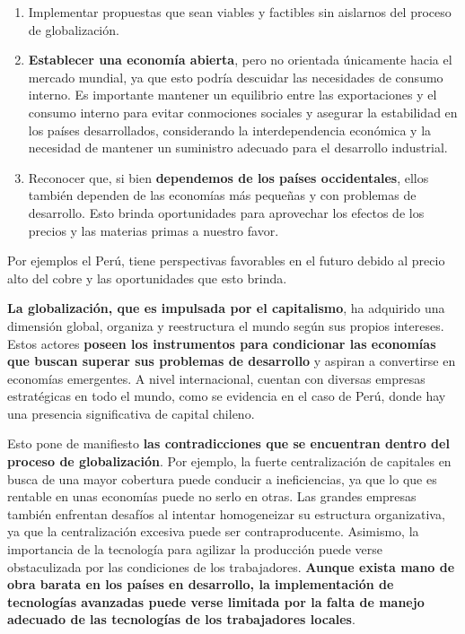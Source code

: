 \documentclass[
  letterpaper,
  DIV=11,
  numbers=noendperiod]{scrartcl}
\begin{document}
\begin{enumerate}
\def\labelenumi{\arabic{enumi}.}
\item
  Implementar propuestas que sean viables y factibles sin aislarnos del
  proceso de globalización.
\item
  \textbf{Establecer una economía abierta}, pero no orientada únicamente
  hacia el mercado mundial, ya que esto podría descuidar las necesidades
  de consumo interno. Es importante mantener un equilibrio entre las
  exportaciones y el consumo interno para evitar conmociones sociales y
  asegurar la estabilidad en los países desarrollados, considerando la
  interdependencia económica y la necesidad de mantener un suministro
  adecuado para el desarrollo industrial.
\item
  Reconocer que, si bien \textbf{dependemos de los países occidentales},
  ellos también dependen de las economías más pequeñas y con problemas
  de desarrollo. Esto brinda oportunidades para aprovechar los efectos
  de los precios y las materias primas a nuestro favor.
\end{enumerate}

Por ejemplos el Perú, tiene perspectivas favorables en el futuro debido
al precio alto del cobre y las oportunidades que esto brinda.

\textbf{La globalización, que es impulsada por el capitalismo}, ha
adquirido una dimensión global, organiza y reestructura el mundo según
sus propios intereses. Estos actores \textbf{poseen los instrumentos
para condicionar las economías que buscan superar sus problemas de
desarrollo} y aspiran a convertirse en economías emergentes. A nivel
internacional, cuentan con diversas empresas estratégicas en todo el
mundo, como se evidencia en el caso de Perú, donde hay una presencia
significativa de capital chileno.

Esto pone de manifiesto \textbf{las contradicciones que se encuentran
dentro del proceso de globalización}. Por ejemplo, la fuerte
centralización de capitales en busca de una mayor cobertura puede
conducir a ineficiencias, ya que lo que es rentable en unas economías
puede no serlo en otras. Las grandes empresas también enfrentan desafíos
al intentar homogeneizar su estructura organizativa, ya que la
centralización excesiva puede ser contraproducente. Asimismo, la
importancia de la tecnología para agilizar la producción puede verse
obstaculizada por las condiciones de los trabajadores. \textbf{Aunque
exista mano de obra barata en los países en desarrollo, la
implementación de tecnologías avanzadas puede verse limitada por la
falta de manejo adecuado de las tecnologías de los trabajadores
locales}.
\end{document}
